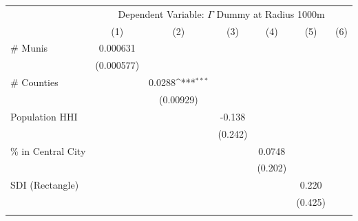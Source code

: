 {
\def\sym#1{\ifmmode^{#1}\else\(^{#1}\)\fi}
\begin{tabular}{l*{6}{c}}
\toprule
                    &\multicolumn{6}{c}{Dependent Variable: \(\Gamma\) Dummy at Radius 1000m}                                                           \\
                    &\multicolumn{1}{c}{(1)}         &\multicolumn{1}{c}{(2)}         &\multicolumn{1}{c}{(3)}         &\multicolumn{1}{c}{(4)}         &\multicolumn{1}{c}{(5)}         &\multicolumn{1}{c}{(6)}         \\
\midrule
\# Munis            &    0.000631         &                     &                     &                     &                     &                     \\
                    &  (0.000577)         &                     &                     &                     &                     &                     \\
\addlinespace
\# Counties         &                     &      0.0288\sym{***}&                     &                     &                     &                     \\
                    &                     &   (0.00929)         &                     &                     &                     &                     \\
\addlinespace
Population HHI      &                     &                     &      -0.138         &                     &                     &                     \\
                    &                     &                     &     (0.242)         &                     &                     &                     \\
\addlinespace
\% in Central City  &                     &                     &                     &      0.0748         &                     &                     \\
                    &                     &                     &                     &     (0.202)         &                     &                     \\
\addlinespace
SDI (Rectangle)     &                     &                     &                     &                     &       0.220         &                     \\
                    &                     &                     &                     &                     &     (0.425)         &                     \\
\addlinespace

\end{tabular}}
